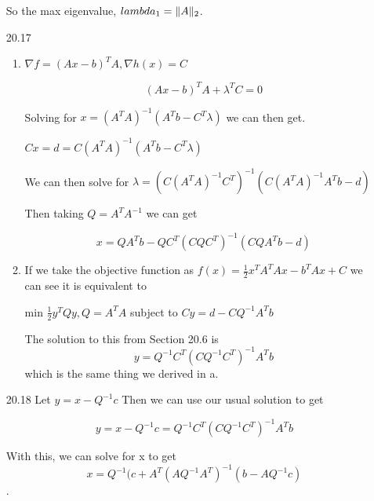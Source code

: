 \documentclass[10pt,a4paper]{article}
\DeclarePairedDelimiter{\l2}{\lVert}{\rVert}
\begin{document}
\begin{enumerate}
    So the max eigenvalue, $lambda_1 = \l2{A}_2$.

    \item [20.17] \begin{enumerate}
        \item $\nabla f = (Ax-b)^TA, \nabla h(x) = C$
        
        $$ (Ax-b)^TA + \lambda^TC = 0$$

        Solving for $x = (A^TA)^{-1}(A^Tb - C^T\lambda)$ we can then get. 

        $Cx = d =  C(A^TA)^{-1}(A^Tb - C^T\lambda)$  

        We can then solve for $\lambda = (C(A^TA)^{-1}C^T)^{-1}(C(A^TA)^{-1}A^Tb-d)$

        Then taking $Q = A^TA^{-1}$ we can get 

        $$ x= QA^Tb - QC^T(CQC^T)^{-1}(CQA^Tb-d)$$

        \item If we take the objective function as $f(x) = \frac{1}{2} x^TA^TAx - b^TAx + C$ we can see it is equivalent to 
        
        min $\frac{1}{2} y^TQy, Q = A^TA$ subject to $Cy = d - CQ^{-1}A^Tb$
        
        The solution to this from Section 20.6 is $$y = Q^{-1}C^T(CQ^{-1}C^T)^{-1} A^Tb$$ which is the same thing we derived in a.
    \end{enumerate}

    \item [20.18] Let $y = x - Q^{-1} c$
    Then we can use our usual solution to get 

    $$y = x -Q^{-1} c =  Q^{-1}C^T(CQ^{-1}C^T)^{-1} A^Tb$$

    With this, we can solve for x to get $$ x = Q^{-1}(c + A^T(AQ^{-1}A^T)^{-1}(b-AQ^{-1}c)$$.
\end{enumerate}
\end{document}
